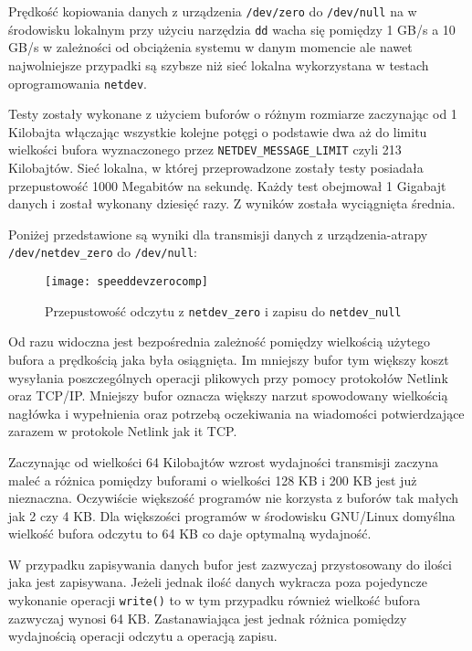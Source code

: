 \documentclass[10pt]{scrartcl}
\begin{document}
Prędkość kopiowania danych z urządzenia \texttt{/dev/zero} do \texttt{/dev/null} na w środowisku lokalnym przy użyciu narzędzia \texttt{dd} wacha się pomiędzy 1 GB/s a 10 GB/s w zależności od obciążenia systemu w danym momencie ale nawet najwolniejsze przypadki są szybsze niż sieć lokalna wykorzystana w testach oprogramowania \texttt{netdev}.

Testy zostały wykonane z użyciem buforów o różnym rozmiarze zaczynając od 1 Kilobajta włączając wszystkie kolejne potęgi o podstawie dwa aż do limitu wielkości bufora wyznaczonego przez \texttt{NETDEV\_MESSAGE\_LIMIT} czyli 213 Kilobajtów. Sieć lokalna, w której przeprowadzone zostały testy posiadała przepustowość 1000 Megabitów na sekundę. Każdy test obejmował 1 Gigabajt danych i został wykonany dziesięć razy. Z wyników została wyciągnięta średnia.

Poniżej przedstawione są wyniki dla transmisji danych z urządzenia-atrapy \texttt{/dev/netdev\_zero} do \texttt{/dev/null}:

\begin{figure}[H]
    \caption{Przepustowość odczytu z \texttt{netdev\_zero} i zapisu do \texttt{netdev\_null}}
    \texttt{[image: speeddevzerocomp]}
\end{figure}

Od razu widoczna jest bezpośrednia zależność pomiędzy wielkością użytego bufora a prędkością jaka była osiągnięta. Im mniejszy bufor tym większy koszt wysyłania poszczególnych operacji plikowych przy pomocy protokołów Netlink oraz TCP/IP\@. Mniejszy bufor oznacza większy narzut spowodowany wielkością nagłówka i wypełnienia oraz potrzebą oczekiwania na wiadomości potwierdzające zarazem w protokole Netlink jak it TCP\@.

Zaczynając od wielkości 64 Kilobajtów wzrost wydajności transmisji zaczyna maleć a różnica pomiędzy buforami o wielkości 128 KB i 200 KB jest już nieznaczna. Oczywiście większość programów nie korzysta z buforów tak małych jak 2 czy 4 KB\@. Dla większości programów w środowisku GNU/Linux domyślna wielkość bufora odczytu to 64 KB co daje optymalną wydajność.

W przypadku zapisywania danych bufor jest zazwyczaj przystosowany do ilości jaka jest zapisywana. Jeżeli jednak ilość danych wykracza poza pojedyncze wykonanie operacji \texttt{write()} to w tym przypadku również wielkość bufora zazwyczaj wynosi 64 KB\@. Zastanawiająca jest jednak różnica pomiędzy wydajnością operacji odczytu a operacją zapisu.
\end{document}
